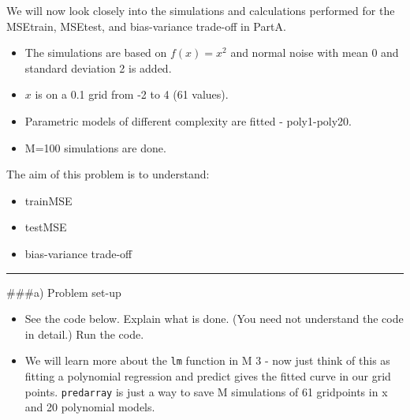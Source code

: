 \documentclass[]{article}
\providecommand{\tightlist}{%
  \setlength{\itemsep}{0pt}\setlength{\parskip}{0pt}}
\begin{document}
We will now look closely into the simulations and calculations performed
for the MSEtrain, MSEtest, and bias-variance trade-off in PartA.

\begin{itemize}
\tightlist
\item
  The simulations are based on \(f(x)=x^2\) and normal noise with mean 0
  and standard deviation 2 is added.
\item
  \(x\) is on a 0.1 grid from -2 to 4 (61 values).
\item
  Parametric models of different complexity are fitted - poly1-poly20.
\item
  M=100 simulations are done.
\end{itemize}

The aim of this problem is to understand:

\begin{itemize}
\tightlist
\item
  trainMSE
\item
  testMSE
\item
  bias-variance trade-off
\end{itemize}

\begin{center}\rule{0.5\linewidth}{\linethickness}\end{center}

\#\#\#a) Problem set-up

\begin{itemize}
\tightlist
\item
  See the code below. Explain what is done. (You need not understand the
  code in detail.) Run the code.
\item
  We will learn more about the \texttt{lm} function in M 3 - now just
  think of this as fitting a polynomial regression and predict gives the
  fitted curve in our grid points. \texttt{predarray} is just a way to
  save M simulations of 61 gridpoints in x and 20 polynomial models.
\end{itemize}
\end{document}

